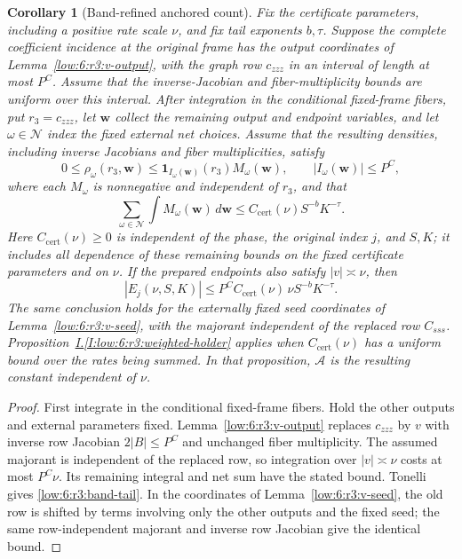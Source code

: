 \documentclass[11pt]{amsart}
\newtheorem{corollary}[theorem]{Corollary}
\theoremstyle{definition}
\theoremstyle{remark}
\numberwithin{equation}{section}
\newcommand{\partIref}[1]{\hyperref[I:#1]{I.\ref*{I:#1}}}
\begin{document}
\begin{corollary}[Band-refined anchored count]\label{low:6:r3:band-count}
Fix the certificate parameters, including a positive rate scale $\nu$, and fix tail exponents $b,\tau$. Suppose the complete coefficient incidence at the original frame has the output coordinates of Lemma~\ref{low:6:r3:v-output}, with the graph row $c_{zzz}$ in an interval of length at most $P^C$. Assume that the inverse-Jacobian and fiber-multiplicity bounds are uniform over this interval. After integration in the conditional fixed-frame fibers, put $r_3=c_{zzz}$, let $\mathbf w$ collect the remaining output and endpoint variables, and let $\omega\in\mathcal N$ index the fixed external net choices. Assume that the resulting densities, including inverse Jacobians and fiber multiplicities, satisfy
\[
0\le\rho_\omega(r_3,\mathbf w)\le\mathbf1_{I_\omega(\mathbf w)}(r_3)M_\omega(\mathbf w),\qquad |I_\omega(\mathbf w)|\le P^C,
\]
where each $M_\omega$ is nonnegative and independent of $r_3$, and that
\[
\sum_{\omega\in\mathcal N}\int M_\omega(\mathbf w)\,d\mathbf w\le C_{\mathrm{cert}}(\nu)S^{-b}K^{-\tau}.
\]
Here $C_{\mathrm{cert}}(\nu)\ge0$ is independent of the phase, the original index $j$, and $S,K$; it includes all dependence of these remaining bounds on the fixed certificate parameters and on $\nu$. If the prepared endpoints also satisfy $|v|\asymp\nu$, then
\begin{equation}\label{low:6:r3:band-tail}
 |E_j(\nu,S,K)|\le P^CC_{\mathrm{cert}}(\nu)\,\nu S^{-b}K^{-\tau}.
\end{equation}
The same conclusion holds for the externally fixed seed coordinates of Lemma~\ref{low:6:r3:v-seed}, with the majorant independent of the replaced row $C_{sss}$. Proposition~\partIref{low:6:r3:weighted-holder} applies when $C_{\mathrm{cert}}(\nu)$ has a uniform bound over the rates being summed. In that proposition, $\mathcal A$ is the resulting constant independent of $\nu$.
\end{corollary}
\begin{proof}
First integrate in the conditional fixed-frame fibers. Hold the other outputs and external parameters fixed. Lemma~\ref{low:6:r3:v-output} replaces $c_{zzz}$ by $v$ with inverse row Jacobian $2|B|\le P^C$ and unchanged fiber multiplicity. The assumed majorant is independent of the replaced row, so integration over $|v|\asymp\nu$ costs at most $P^C\nu$. Its remaining integral and net sum have the stated bound. Tonelli gives \eqref{low:6:r3:band-tail}. In the coordinates of Lemma~\ref{low:6:r3:v-seed}, the old row is shifted by terms involving only the other outputs and the fixed seed; the same row-independent majorant and inverse row Jacobian give the identical bound.
\end{proof}
\end{document}

